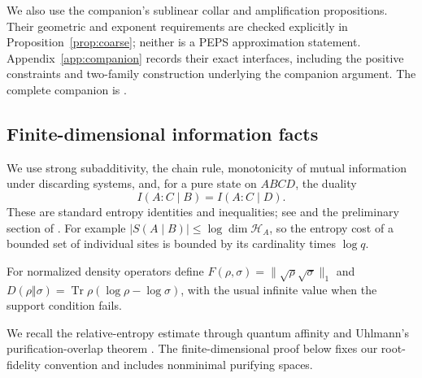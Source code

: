\documentclass[11pt]{article}
\numberwithin{equation}{section}
\theoremstyle{definition}
\theoremstyle{remark}
\begin{document}
We also use the companion's sublinear collar and amplification propositions.
Their geometric and exponent requirements are checked explicitly in
Proposition~\ref{prop:coarse}; neither is a PEPS approximation statement.
Appendix~\ref{app:companion} records their exact interfaces, including the
positive constraints and two-family construction underlying the companion
argument. The complete companion is \cite{RepoAreaLaw}.

\subsection{Finite-dimensional information facts}

We use strong subadditivity, the chain rule, monotonicity of mutual
information under discarding systems, and, for a pure state on $ABCD$,
the duality
\[
 I(A:C\mid B)=I(A:C\mid D).
\]
These are standard entropy identities and inequalities; see
\cite{LiebRuskai1973} and the preliminary section of \cite{RepoAreaLaw}.
For example $|S(A\mid B)|\le\log\dim\mathcal H_A$, so the entropy cost
of a bounded set of individual sites is bounded by its cardinality times
$\log q$.

For normalized density operators define
$F(\rho,\sigma)=\lVert \sqrt\rho\sqrt\sigma\rVert_1$ and
$D(\rho\Vert\sigma)=\operatorname{Tr}\rho(\log\rho-\log\sigma)$, with the usual
infinite value when the support condition fails.

We recall the relative-entropy estimate through quantum affinity
\cite[Equation~(2.9)]{CarlenLieb2014} and Uhlmann's purification-overlap
theorem \cite[Sections~2 and~5]{Uhlmann1976}. The finite-dimensional proof
below fixes our root-fidelity convention and includes nonminimal purifying
spaces.
\end{document}
